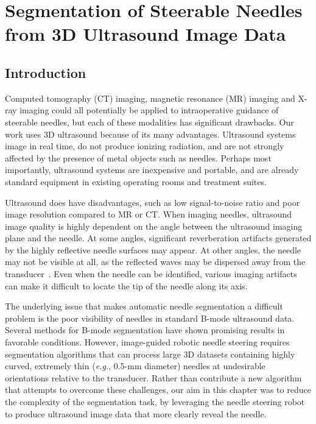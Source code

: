\chapter[Segmentation from 3D Ultrasound]{Segmentation of Steerable Needles from 3D Ultrasound Image Data}

\section{Introduction}
Computed tomography (CT) imaging, magnetic resonance (MR) imaging and X-ray imaging could all potentially be applied to intraoperative guidance of steerable needles, but each of these modalities has significant drawbacks. Our work uses 3D ultrasound because of its many advantages. Ultrasound systems image in real time, do not produce ionizing radiation, and are not strongly affected by the presence of metal objects such as needles. Perhaps most importantly, ultrasound systems are inexpensive and portable, and are already standard equipment in existing operating rooms and treatment suites.  

Ultrasound does have disadvantages, such as low signal-to-noise ratio and poor image resolution compared to MR or CT. When imaging needles, ultrasound image quality is highly dependent on the angle between the ultrasound imaging plane and the needle. At some angles, significant reverberation artifacts generated by the highly reflective needle surfaces may appear. At other angles, the needle may not be visible at all, as the reflected waves may be dispersed away from the transducer~\cite{Chung2004}. Even when the needle can be identified, various imaging artifacts can make it difficult to locate the tip of the needle along its axis. 

The underlying issue that makes automatic needle segmentation a difficult problem is the poor visibility of needles in standard B-mode ultrasound data. Several methods for B-mode segmentation have shown promising results in favorable conditions. However, image-guided robotic needle steering requires segmentation algorithms that can process large 3D datasets containing highly curved, extremely thin (\textit{e.g.}, 0.5-mm diameter) needles at undesirable orientations relative to the transducer. Rather than contribute a new algorithm that attempts to overcome these challenges, our aim in this chapter was to reduce the complexity of the segmentation task, by leveraging the needle steering robot to produce ultrasound image data that more clearly reveal the needle.

